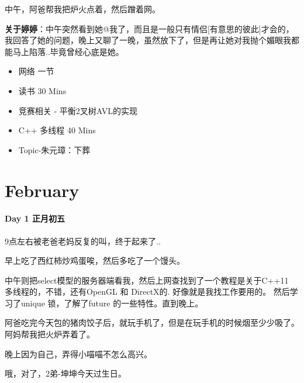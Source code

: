\documentclass[UTF8,a4paper,8pt]{ctexart}
\begin{document}
		 中午，阿爸帮我把炉火点着，然后蹭着网。
		 
		 \textbf{关于婷婷}：中午突然看到她@我了，而且是一般只有情侣[有意思的彼此]才会的，我回答了她的问题，晚上又聊了一晚，虽然放下了，但是再让她对我抛个媚眼我都能马上陷落..毕竟曾经心底是她。
		 
		  \begin{itemize}
		  	\item  \makebox[0pt][l]{$\square$}\raisebox{.15ex}{\hspace{0.1em}$\checkmark$} 网络  一节
		  	
		  	\item  \makebox[0pt][l]{$\square$}\raisebox{.15ex}{\hspace{0.1em}$\checkmark$} 读书  30 Mins		 	 
		  	\item  \makebox[0pt][l]{$\square$}\raisebox{.15ex}{\hspace{0.1em}$\checkmark$} 竞赛相关 - 平衡2叉树AVL的实现
		  	\item   C++ 多线程  40 Mins
		  	
		  	\item  Topic-朱元璋：下葬
		  \end{itemize}  
 \section{February}
 	 \paragraph{Day 1   正月初五    \quad     }
	 	 9点左右被老爸老妈反复的叫，终于起来了..
	 	 
	 	 早上吃了西红柿炒鸡蛋唉，然后多吃了一个馒头。
	 	 
	 	 中午则把select模型的服务器端看我，然后上网查找到了一个教程是关于C++11 多线程的，不错，还有OpenGL 和 DirectX的. 好像就是我找工作要用的。 然后学习了unique 锁，了解了future 的一些特性。直到晚上。
	 	 
	 	 阿爸吃完今天包的猪肉饺子后，就玩手机了，但是在玩手机的时候烟至少少吸了。阿妈帮我把火炉弄着了。
	 	 
	 	 晚上因为自己，弄得小喵喵不怎么高兴。
	 	 
	 	 哦，对了，2弟-坤坤今天过生日。
	 	 
\end{document}
